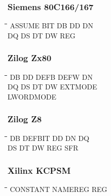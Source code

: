 \subsubsection{Siemens 80C166/167}
{\tt\begin{tabbing}
\hspace{3cm}\=\hspace{3cm}\=\hspace{3cm}\=\hspace{3cm}\=\kill
ASSUME     \> BIT         \> DB          \> DD          \> DN \\
DQ         \> DS          \> DT          \> DW          \> REG \\
\end{tabbing}}

\subsubsection{Zilog Zx80}
{\tt\begin{tabbing}
\hspace{3cm}\=\hspace{3cm}\=\hspace{3cm}\=\hspace{3cm}\=\kill
DB         \> DD          \> DEFB        \> DEFW        \> DN \\
DQ         \> DS          \> DT          \> DW          \> EXTMODE \\
LWORDMODE \\
\end{tabbing}}

\subsubsection{Zilog Z8}
{\tt\begin{tabbing}
\hspace{3cm}\=\hspace{3cm}\=\hspace{3cm}\=\hspace{3cm}\=\kill
DB         \> DEFBIT      \> DD          \> DN          \> DQ \\
DS         \> DT          \> DW          \> REG         \> SFR \\
\end{tabbing}}

\subsubsection{Xilinx KCPSM}
{\tt\begin{tabbing}
\hspace{3cm}\=\hspace{3cm}\=\hspace{3cm}\=\hspace{3cm}\=\kill
CONSTANT   \> NAMEREG     \> REG \\
\end{tabbing}}

